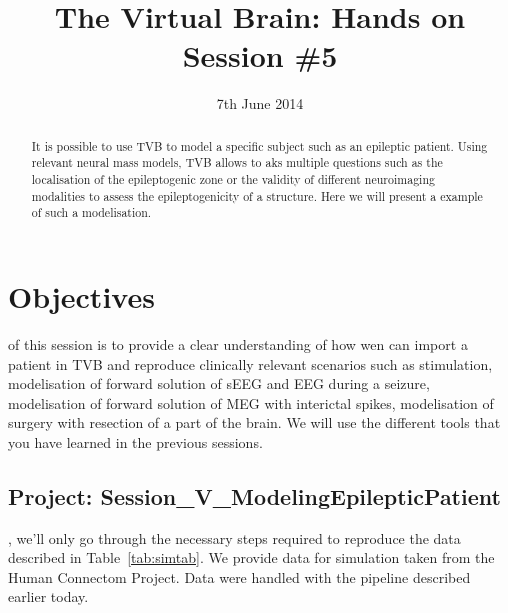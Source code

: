 \documentclass{tufte-handout}
\title{The Virtual Brain: Hands on Session \#5}
\date{7th June 2014}
\begin{document}

\newpage
\ClearWallPaper


\begin{abstract}
\noindent It is possible to use TVB to model a specific subject such as an epileptic patient. Using relevant neural
mass models, TVB allows to aks multiple questions such as the localisation of the epileptogenic zone or the validity
of different neuroimaging modalities to assess the epileptogenicity of a structure. Here we will present a example of
such a modelisation.
\end{abstract}


 

\section{Objectives}\label{sec:objectives}
 of this session is to provide a clear understanding of how wen can import a patient in TVB and reproduce clinically
relevant scenarios such as stimulation, modelisation of forward solution of sEEG and EEG during a seizure, modelisation of
forward solution of MEG  with interictal spikes, modelisation of surgery with resection of a part of the brain. We will use the different tools that you have learned in the previous sessions.


\subsection{Project: Session\_V\_ModelingEpilepticPatient }\label{sec:project_data}

, we'll only go through the necessary steps
required to reproduce the data described in Table~\ref{tab:simtab}.  
We provide data for simulation taken from the Human Connectom Project. Data were handled with the pipeline described earlier today.
\end{document}
